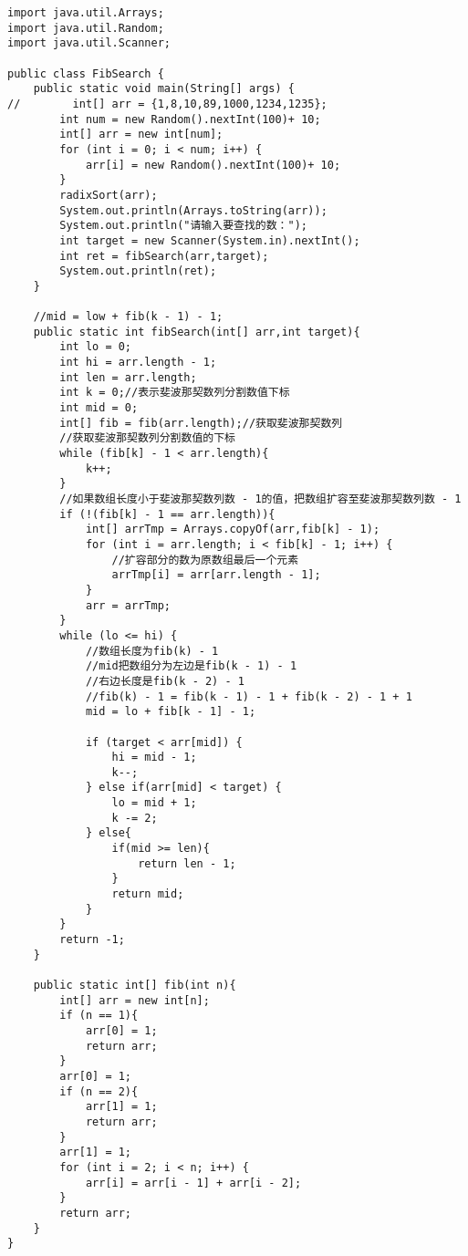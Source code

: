 \documentclass[a4paper]{report}
\begin{document}
\begin{lstlisting}
import java.util.Arrays;
import java.util.Random;
import java.util.Scanner;

public class FibSearch {
    public static void main(String[] args) {
//        int[] arr = {1,8,10,89,1000,1234,1235};
        int num = new Random().nextInt(100)+ 10;
        int[] arr = new int[num];
        for (int i = 0; i < num; i++) {
            arr[i] = new Random().nextInt(100)+ 10;
        }
        radixSort(arr);
        System.out.println(Arrays.toString(arr));
        System.out.println("请输入要查找的数：");
        int target = new Scanner(System.in).nextInt();
        int ret = fibSearch(arr,target);
        System.out.println(ret);
    }

    //mid = low + fib(k - 1) - 1;
    public static int fibSearch(int[] arr,int target){
        int lo = 0;
        int hi = arr.length - 1;
        int len = arr.length;
        int k = 0;//表示斐波那契数列分割数值下标
        int mid = 0;
        int[] fib = fib(arr.length);//获取斐波那契数列
        //获取斐波那契数列分割数值的下标
        while (fib[k] - 1 < arr.length){
            k++;
        }
        //如果数组长度小于斐波那契数列数 - 1的值，把数组扩容至斐波那契数列数 - 1
        if (!(fib[k] - 1 == arr.length)){
            int[] arrTmp = Arrays.copyOf(arr,fib[k] - 1);
            for (int i = arr.length; i < fib[k] - 1; i++) {
                //扩容部分的数为原数组最后一个元素
                arrTmp[i] = arr[arr.length - 1];
            }
            arr = arrTmp;
        }
        while (lo <= hi) {
            //数组长度为fib(k) - 1
            //mid把数组分为左边是fib(k - 1) - 1
            //右边长度是fib(k - 2) - 1
            //fib(k) - 1 = fib(k - 1) - 1 + fib(k - 2) - 1 + 1
            mid = lo + fib[k - 1] - 1;

            if (target < arr[mid]) {
                hi = mid - 1;
                k--;
            } else if(arr[mid] < target) {
                lo = mid + 1;
                k -= 2;
            } else{
                if(mid >= len){
                    return len - 1;
                }
                return mid;
            }
        }
        return -1;
    }

    public static int[] fib(int n){
        int[] arr = new int[n];
        if (n == 1){
            arr[0] = 1;
            return arr;
        }
        arr[0] = 1;
        if (n == 2){
            arr[1] = 1;
            return arr;
        }
        arr[1] = 1;
        for (int i = 2; i < n; i++) {
            arr[i] = arr[i - 1] + arr[i - 2];
        }
        return arr;
    }
}
\end{lstlisting}
\end{document}
